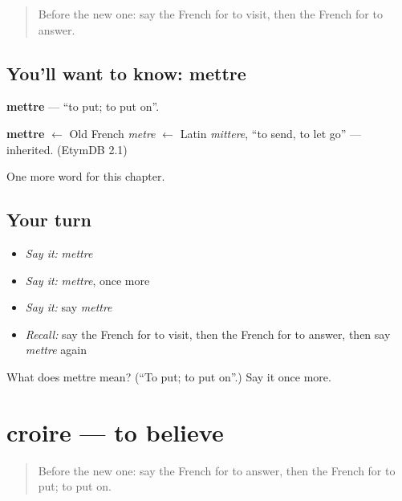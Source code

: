 \label{lesson:FR-C137-mettre}



\begin{quote}
Before the new one: say the French for to visit, then the French for to answer.
\end{quote}

\subsection*{You'll want to know: mettre}
\textbf{mettre} — \textquotedblleft{}to put; to put on\textquotedblright{}.

\begin{cousinweb}
\textbf{mettre} $\leftarrow$ Old French \emph{metre} $\leftarrow$ Latin \emph{mittere}, \textquotedblleft{}to send, to let go\textquotedblright{} — inherited. (EtymDB 2.1)
\end{cousinweb}

\begin{grammarlens}[title={What you've built}]
One more word for this chapter.
\end{grammarlens}

\subsection*{Your turn}
\begin{itemize}
\raggedright
  \item \emph{Say it:} \emph{mettre}
  \item \emph{Say it:} \emph{mettre}, once more
  \item \emph{Say it:} say \emph{mettre}
  \item \emph{Recall:} say the French for to visit, then the French for to answer, then say \emph{mettre} again
\end{itemize}

\begin{tcolorbox}[breakable,colback=teal!4,colframe=teal!35!black,title={Before you move on}]
What does mettre mean? (\textquotedblleft{}To put; to put on\textquotedblright{}.) Say it once more.
\end{tcolorbox}
\section[croire]{croire — to believe}

\label{lesson:FR-C137-croire}



\begin{quote}
Before the new one: say the French for to answer, then the French for to put; to put on.
\end{quote}


